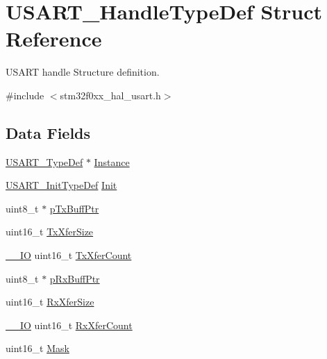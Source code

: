 \hypertarget{struct_u_s_a_r_t___handle_type_def}{}\section{U\+S\+A\+R\+T\+\_\+\+Handle\+Type\+Def Struct Reference}
\label{struct_u_s_a_r_t___handle_type_def}


U\+S\+A\+RT handle Structure definition.  




{\ttfamily \#include $<$stm32f0xx\+\_\+hal\+\_\+usart.\+h$>$}

\subsection*{Data Fields}
\begin{DoxyCompactItemize}
\item 
\hyperlink{struct_u_s_a_r_t___type_def}{U\+S\+A\+R\+T\+\_\+\+Type\+Def} $\ast$ \hyperlink{struct_u_s_a_r_t___handle_type_def_a2b30b6d22df80fbebd8ceefc6f162310}{Instance}
\item 
\hyperlink{struct_u_s_a_r_t___init_type_def}{U\+S\+A\+R\+T\+\_\+\+Init\+Type\+Def} \hyperlink{struct_u_s_a_r_t___handle_type_def_a5f2f1b2ea49a64918c58f95c97fe58f6}{Init}
\item 
uint8\+\_\+t $\ast$ \hyperlink{struct_u_s_a_r_t___handle_type_def_a5cc31f7c52dafd32f27f8f2756dbf343}{p\+Tx\+Buff\+Ptr}
\item 
uint16\+\_\+t \hyperlink{struct_u_s_a_r_t___handle_type_def_a80907b65d6f9541bc0dee444d16bc45b}{Tx\+Xfer\+Size}
\item 
\hyperlink{core__sc300_8h_aec43007d9998a0a0e01faede4133d6be}{\+\_\+\+\_\+\+IO} uint16\+\_\+t \hyperlink{struct_u_s_a_r_t___handle_type_def_a1823437fbed80bdd1510782ced4e5532}{Tx\+Xfer\+Count}
\item 
uint8\+\_\+t $\ast$ \hyperlink{struct_u_s_a_r_t___handle_type_def_a7cee540cb21048ac48ba17355440e668}{p\+Rx\+Buff\+Ptr}
\item 
uint16\+\_\+t \hyperlink{struct_u_s_a_r_t___handle_type_def_ac12f5f1f6295b3c3327d5feabf5a96fb}{Rx\+Xfer\+Size}
\item 
\hyperlink{core__sc300_8h_aec43007d9998a0a0e01faede4133d6be}{\+\_\+\+\_\+\+IO} uint16\+\_\+t \hyperlink{struct_u_s_a_r_t___handle_type_def_ad95a26d6b12b7087bba3d1b769175db2}{Rx\+Xfer\+Count}
\item 
uint16\+\_\+t \hyperlink{struct_u_s_a_r_t___handle_type_def_ab8dae64f3b86c2eb2b7a080fcdee3ef4}{Mask}

\end{DoxyCompactItemize}
